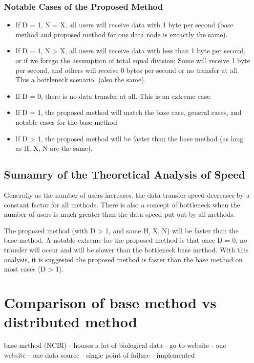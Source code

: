 \documentclass[acmsmall]{acmart}
\begin{document}
\subsubsection{Notable Cases of the Proposed Method}
\begin{itemize}
    \item  If D = 1, N = X, all users will receive data with 1 byte per second (base method and proposed method for one data node is excactly the same).
    \item If D = 1, N > X, all users will receive data with less than 1 byte per second, or if we forego the assumption of total equal division: Some will receive 1 byte per second, and others will receive 0 bytes per second or no transfer at all. This a bottleneck scenario. (also the same).
    \item If D = 0, there is no data transfer at all. This is an extreme case.
    \item If D = 1, the proposed method will match the base case, general cases, and notable cases for the base method
    \item If D > 1, the proposed method will be faster than the base method (as long as H, X, N are the same).
\end{itemize}

\subsection{Sumamry of the Theoretical Analysis of Speed}
Generally as the number of users increases, the data transfer speed decreases by a constant factor for all methods. There is also a concept of bottleneck when the number of users is much greater than the data speed put out by all methods.

The proposed method (with D > 1, and same H, X, N) will be faster than the base method. A notable extreme for the proposed method is that once D = 0, no transfer will occur and will be slower than the bottleneck base method. With this analysis, it is suggested the proposed method is faster than the base method on most cases (D > 1). 

\section{Comparison of base method vs distributed method}

base method (NCBI)
- houses a lot of biological data
- go to website
- one website
- one data source
- single point of failure \cite{seqtorr}
- implemented
\end{document}
